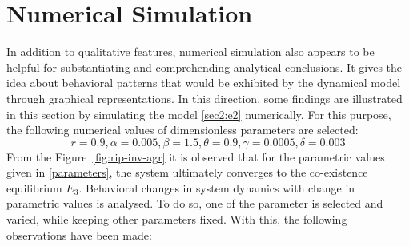 \documentclass[12pt]{article}
\numberwithin{equation}{section}
\begin{document}
\section{Numerical Simulation}
In addition to qualitative features, numerical simulation also appears to be helpful for substantiating and comprehending analytical conclusions. It gives the idea about behavioral patterns that would be exhibited by the dynamical model through graphical representations. In this direction, some findings are illustrated in this section by simulating the model \eqref{sec2:e2} numerically. For this purpose, the following numerical values of dimensionless parameters are selected:
\begin{equation}\label{parameters}
r = 0.9, \alpha=0.005, \beta=1.5, \theta=0.9, \gamma=0.0005, \delta=0.003
\end{equation}
From the Figure~\ref{fig:rip-inv-agr} it is observed that for the parametric values given in \eqref{parameters}, the system ultimately converges to the co-existence equilibrium $E_3$. Behavioral changes in system dynamics with change in parametric values is analysed. To do so, one of the parameter is selected and varied, while keeping other parameters fixed. With this, the following observations have been made:
\end{document}
